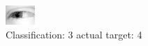 \begin{figure}[h!]
\begin{center}
\includegraphics[width=0.60\columnwidth]{figures/ID2479_class_3_target_4.png}
\end{center}
\caption{ Classification: 3 actual target: 4}
\label{fig:ID2479_class_3_target_4}
\end{figure}

